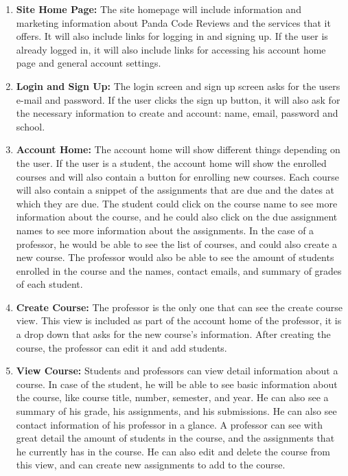\begin{enumerate}

\item \textbf{Site Home Page:} The site homepage will include information and
marketing information about Panda Code Reviews and the services that it offers.
It will also include links for logging in and signing up. If the user is already
logged in, it will also include links for accessing his account home page and
general account settings.

\item \textbf{Login and Sign Up:} The login screen and sign up screen asks for
the users e-mail and password. If the user clicks the sign up button, it will
also ask for the necessary information to create and account: name,
email, password and school.

\item \textbf{Account Home:} The account home will show different things
depending on the user. If the user is a student, the account home will show the
enrolled courses and will also contain a button for enrolling new courses. Each
course will also contain a snippet of the assignments that are due and the dates
at which they are due. The student could click on the course name to see more
information about the course, and he could also click on the due assignment
names to see more information about the assignments. In the case of a professor,
he would be able to see the list of courses, and could also create a new course.
The professor would also be able to see the amount of students enrolled in the
course and the names, contact emails, and summary of grades of each student.

\item \textbf{Create Course:} The professor is the only one that can see the
create course view. This view is included as part of the account home of the
professor, it is a drop down that asks for the new course's information. After
creating the course, the professor can edit it and add students.

\item \textbf{View Course:} Students and professors can view detail information
about a course. In case of the student, he will be able to see basic information
about the course, like course title, number, semester, and year. He can also see
a summary of his grade, his assignments, and his submissions. He can also see
contact information of his professor in a glance. A professor can see with great
detail the amount of students in the course, and the assignments that he
currently has in the course. He can also edit and delete the course from this
view, and can create new assignments to add to the course.


\end{enumerate}
